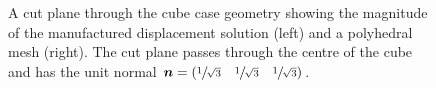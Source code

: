 \documentclass[sn-mathphys,Numbered]{sn-jnl}%
\newcommand{\bb}{\boldsymbol}
\begin{document}
\begin{figure}[htbp]
	\centering
	\caption{A cut plane through the cube case geometry showing the magnitude of the manufactured displacement solution (left) and a polyhedral mesh (right). The cut plane passes through the centre of the cube and has the unit normal $\bb{n} = (\sfrac{1}{\sqrt{3}} \quad \sfrac{1}{\sqrt{3}} \quad \sfrac{1}{\sqrt{3}})$.}
	\label{fig:mms}
\end{figure}
\end{document}
